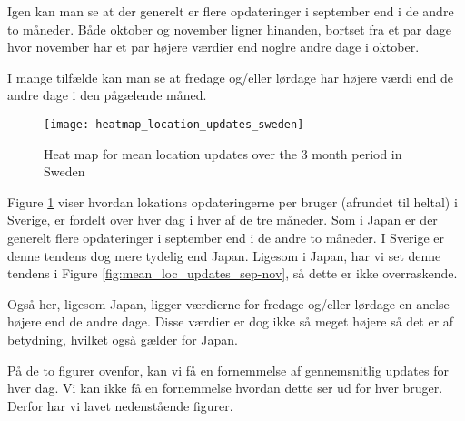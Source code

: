 Igen kan man se at der generelt er flere opdateringer i september end i de andre to måneder. Både oktober og november ligner hinanden, bortset fra et par dage hvor november har et par højere værdier end noglre andre dage i oktober. 

I mange tilfælde kan man se at fredage og/eller lørdage har højere værdi end de andre dage i den pågælende måned.






\begin{figure}[H]
    \hspace*{-1.5cm}
    \centering
    \texttt{[image: heatmap\_location\_updates\_sweden]}
    \caption{Heat map for mean location updates over the 3 month period in Sweden}
    \label{fig:heatmap_swe}
\end{figure}

Figure \ref{fig:heatmap_swe} viser hvordan lokations opdateringerne per bruger (afrundet til heltal) i Sverige, er fordelt over hver dag i hver af de tre måneder. Som i Japan er der generelt flere opdateringer i september end i de andre to måneder. I Sverige er denne tendens dog mere tydelig end Japan. Ligesom i Japan, har vi set denne tendens i Figure 
\ref{fig:mean_loc_updates_sep-nov}, så dette er ikke overraskende. 
 
Også her, ligesom Japan, ligger værdierne for fredage og/eller lørdage en anelse højere end de andre dage. Disse værdier er dog ikke så meget højere så det er af betydning, hvilket også gælder for Japan. 

På de to figurer ovenfor, kan vi få en fornemmelse af gennemsnitlig updates for hver dag. Vi kan ikke få en fornemmelse hvordan dette ser ud for hver bruger. Derfor har vi lavet nedenstående figurer. 

